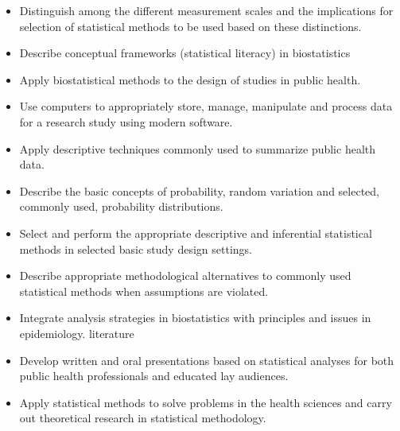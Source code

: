 \documentclass[10pt]{article}
\begin{document}
\bigskip
{}
\begin{itemize}
\item Distinguish among the different measurement scales and the implications for selection of statistical methods to be used based on these distinctions.
\item Describe conceptual frameworks (statistical literacy) in biostatistics
\item Apply biostatistical methods to the design of studies in public health.
\item Use computers to appropriately store, manage, manipulate and process data for a research study using modern software.
\item Apply descriptive techniques commonly used to summarize public health data.
\item Describe the basic concepts of probability, random variation and selected, commonly used, probability distributions.
\item Select and perform the appropriate descriptive and inferential statistical methods in selected basic study design settings.
\item Describe appropriate methodological alternatives to commonly used statistical methods when assumptions are violated.
\item Integrate analysis strategies in biostatistics with principles and issues in epidemiology.
literature
\item Develop written and oral presentations based on statistical analyses for both public health professionals and educated lay audiences.
\item Apply statistical methods to solve problems in the health sciences and carry out theoretical research in statistical methodology.
\end{itemize}
\end{document}
